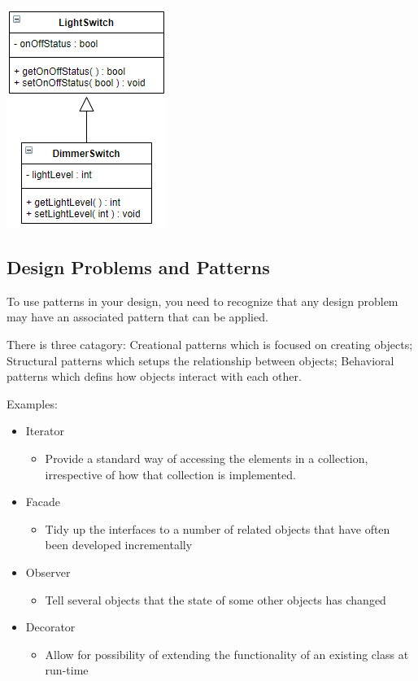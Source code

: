 \documentclass{article}
\begin{document}
    \begin{center}
        \includegraphics[scale=0.7]{abstraction.png}
    \end{center}

    \subsection*{Design Problems and Patterns}

    To use patterns in your design, you need to recognize that any design problem may have 
    an associated pattern that can be applied.

    There is three catagory: Creational patterns which is focused on creating objects; 
    Structural patterns which setups the relationship between objects; Behavioral patterns 
    which defins how objects interact with each other.

    Examples: 
    \begin{itemize}
        \item Iterator 
        \begin{itemize}
            \item Provide a standard way of accessing the elements in a collection,
            irrespective of how that collection is implemented.
        \end{itemize}
        \item Facade
        \begin{itemize}
            \item Tidy up the interfaces to a number of related objects that have often been 
            developed incrementally
        \end{itemize}
        \item Observer
        \begin{itemize}
            \item Tell several objects that the state of some other objects has changed 
        \end{itemize}
        \item Decorator
        \begin{itemize}
            \item Allow for possibility of extending the functionality of an existing class at 
            run-time
        \end{itemize}
    \end{itemize}
\end{document}
